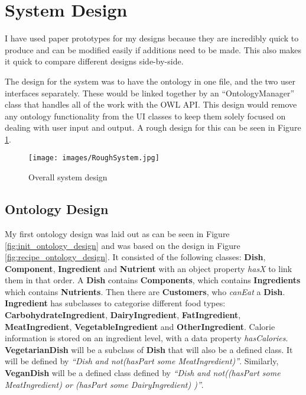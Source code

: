 \section{System Design}

I have used paper prototypes \cite{snyder2003paper} for my designs because they are incredibly quick to produce and can be modified easily if additions need to be made. This also makes it quick to compare different designs side-by-side.

The design for the system was to have the ontology in one file, and the two user interfaces separately. These would be linked together by an ``OntologyManager'' class that handles all of the work with the OWL API. This design would remove any ontology functionality from the UI classes to keep them solely focused on dealing with user input and output. A rough design for this can be seen in Figure \ref{fig:overall_system_design}.

\begin{figure}[h]
    \centering
    \captionsetup{justification=centering}
    \texttt{[image: images/RoughSystem.jpg]}
    \caption{Overall system design}
    \label{fig:overall_system_design}
\end{figure}

\subsection{Ontology Design}

My first ontology design was laid out as can be seen in Figure \ref{fig:init_ontology_design} and was based on the design in Figure \ref{fig:recipe_ontology_design}. It consisted of the following classes: \textbf{Dish}, \textbf{Component}, \textbf{Ingredient} and \textbf{Nutrient} with an object property \textit{hasX} to link them in that order. A \textbf{Dish} contains \textbf{Components}, which contains \textbf{Ingredients} which contains \textbf{Nutrients}. Then there are \textbf{Customers}, who \textit{canEat} a \textbf{Dish}. \textbf{Ingredient} has subclasses to categorise different food types: \textbf{CarbohydrateIngredient}, \textbf{DairyIngredient}, \textbf{FatIngredient}, \textbf{MeatIngredient}, \textbf{VegetableIngredient} and \textbf{OtherIngredient}. Calorie information is stored on an ingredient level, with a data property \textit{hasCalories}. \textbf{VegetarianDish} will be a subclass of \textbf{Dish} that will also be a defined class. It will be defined by \textit{ ``Dish and not(hasPart some MeatIngredient)''}. Similarly, \textbf{VeganDish} will be a defined class defined by \textit{ ``Dish and not((hasPart some MeatIngredient) or (hasPart some DairyIngredient) )''}.

